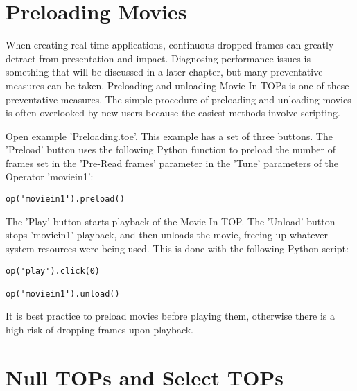 
\section{Preloading Movies}

\begin{fullwidth}
When creating real-time applications, continuous dropped frames can greatly detract from presentation and impact. Diagnosing performance issues is something that will be discussed in a later chapter, but many preventative measures can be taken. Preloading and unloading Movie In TOPs is one of these preventative measures. The simple procedure of preloading and unloading movies is often overlooked by new users because the easiest methods involve scripting.

Open example 'Preloading.toe'. This example has a set of three buttons. The 'Preload' button uses the following Python function to preload the number of frames set in the 'Pre-Read frames' parameter in the 'Tune' parameters of the Operator 'moviein1':

\begin{lstlisting}
op('moviein1').preload()
\end{lstlisting}

The 'Play' button starts playback of the Movie In TOP. The 'Unload' button stops 'moviein1' playback, and then unloads the movie, freeing up whatever system resources were being used. This is done with the following Python script:

\begin{lstlisting}
op('play').click(0)

op('moviein1').unload()
\end{lstlisting}

It is best practice to preload movies before playing them, otherwise there is a high risk of dropping frames upon playback.

\end{fullwidth}


\section{Null TOPs and Select TOPs}


